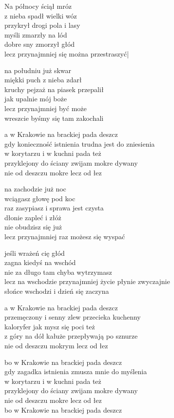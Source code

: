 \begin{text}
    \small{
    Na północy ściął mróz\\
    z nieba spadł wielki wóz\\
    przykrył drogi pola i lasy\\
    myśli zmarzły na lód\\
    dobre sny zmorzył głód\\
    lecz przynajmniej się można przestraszyć|

    na południu już skwar\\
    miękki puch z nieba zdarł\\
    kruchy pejzaż na piasek przepalił\\
    jak upalnie mój boże\\
    lecz przynajmniej być może\\
    wreszcie byśmy się tam zakochali

    a w Krakowie na brackiej pada deszcz\\
    gdy konieczność istnienia trudna jest do zniesienia\\
    w korytarzu i w kuchni pada też\\
    przyklejony do ściany zwijam mokre dywany\\
    nie od deszczu mokre lecz od łez

    na zachodzie już noc\\
    wciągasz głowę pod koc\\
    raz zasypiasz i sprawa jest czysta\\
    dłonie zapleć i złóż\\
    nie obudzisz się już\\
    lecz przynajmniej raz możesz się wyspać

    jeśli wrażeń cię głód\\
    zagna kiedyś na wschód\\
    nie za długo tam chyba wytrzymasz\\
    lecz na wschodzie przynajmniej życie płynie zwyczajnie\\
    słońce wschodzi i dzień się zaczyna

    a w Krakowie na brackiej pada deszcz\\
    przemęczony i senny zlew przecieka kuchenny\\
    kaloryfer jak mysz się poci też\\
    z góry na dół kałuże przepływają po sznurze\\
    nie od deszczu mokrym lecz od łez

    bo w Krakowie na brackiej pada deszcz\\
    gdy zagadka istnienia zmusza mnie do myślenia\\
    w korytarzu i w kuchni pada też\\
    przyklejony do ściany zwijam mokre dywany\\
    nie od deszczu mokre lecz od łez\\
    bo w Krakowie na brackiej pada deszcz
    }
\end{text}
